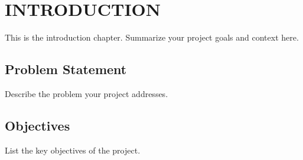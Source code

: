 \chapter{INTRODUCTION}
\label{ch:intro}

This is the introduction chapter. Summarize your project goals and context here.

\section{Problem Statement}
Describe the problem your project addresses.

\section{Objectives}
List the key objectives of the project.




